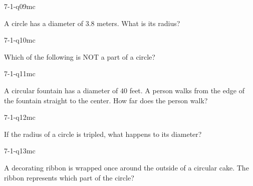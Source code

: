 \begin{practiceQuestion}{7-1-q09}{mc}
\begin{questionText}
A circle has a diameter of $3.8$ meters. What is its radius?
\end{questionText}
\end{practiceQuestion}

\begin{practiceQuestion}{7-1-q10}{mc}
\begin{questionText}
Which of the following is NOT a part of a circle?
\end{questionText}
\end{practiceQuestion}

\begin{practiceQuestion}{7-1-q11}{mc}
\begin{questionText}
A circular fountain has a diameter of $40$ feet. A person walks from the edge of the fountain straight to the center. How far does the person walk?
\end{questionText}
\end{practiceQuestion}

\begin{practiceQuestion}{7-1-q12}{mc}
\begin{questionText}
If the radius of a circle is tripled, what happens to its diameter?
\end{questionText}
\end{practiceQuestion}

\begin{practiceQuestion}{7-1-q13}{mc}
\begin{questionText}
A decorating ribbon is wrapped once around the outside of a circular cake. The ribbon represents which part of the circle?
\end{questionText}
\end{practiceQuestion}

